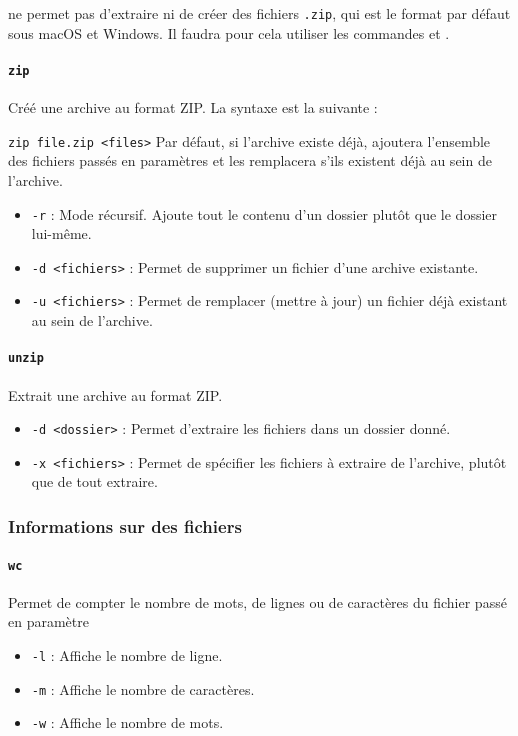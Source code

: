   ne permet pas d'extraire ni de créer des fichiers \texttt{.zip}, qui est le format par défaut sous macOS et Windows. Il faudra pour cela utiliser les commandes  et .

\paragraph{\texttt{zip}} 
Créé une archive au format ZIP. La syntaxe est la suivante : 
\begin{nscenter}
\texttt{zip file.zip <files>}
Par défaut, si l'archive existe déjà,  ajoutera l'ensemble des fichiers passés en paramètres et les remplacera s'ils existent déjà au sein de l'archive.
\end{nscenter}
\begin{itemize}
    \item \texttt{-r} : Mode récursif. Ajoute tout le contenu d'un dossier plutôt que le dossier lui-même.
    \item \texttt{-d <fichiers>} : Permet de supprimer un fichier d'une archive existante.
    \item \texttt{-u <fichiers>} : Permet de remplacer (mettre à jour) un fichier déjà existant au sein de l'archive.
\end{itemize}

\paragraph{\texttt{unzip}} 
Extrait une archive au format ZIP.
\begin{itemize}
    \item \texttt{-d <dossier>} : Permet d'extraire les fichiers dans un dossier donné.
    \item \texttt{-x <fichiers>} : Permet de spécifier les fichiers à extraire de l'archive, plutôt que de tout extraire.
\end{itemize}

\newpage

\subsubsection{Informations sur des fichiers}

\paragraph{\texttt{wc}} 
Permet de compter le nombre de mots, de lignes ou de caractères du fichier passé en paramètre
\begin{itemize}
    \item \texttt{-l} : Affiche le nombre de ligne.
    \item \texttt{-m} : Affiche le nombre de caractères.
    \item \texttt{-w} : Affiche le nombre de mots.
\end{itemize}

